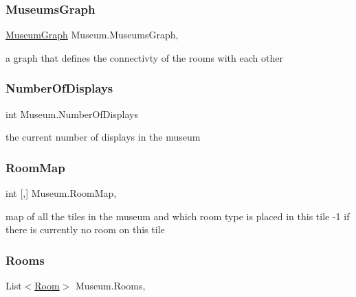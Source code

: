 \subsubsection{\texorpdfstring{Museums\+Graph}{MuseumsGraph}}
{\footnotesize\ttfamily \mbox{\hyperlink{class_museum_graph}{Museum\+Graph}} Museum.\+Museums\+Graph\hspace{0.3cm}{\ttfamily [get]}, {}}



a graph that defines the connectivty of the rooms with each other 

\mbox{\label{class_museum_ac6942612f3be979812b450ee9140caf1}} 
\subsubsection{\texorpdfstring{Number\+Of\+Displays}{NumberOfDisplays}}
{\footnotesize\ttfamily int Museum.\+Number\+Of\+Displays\hspace{0.3cm}{\ttfamily [get]}}



the current number of displays in the museum 

\mbox{\label{class_museum_add7cf92391f0c501eaf2ebb76ddd54f6}} 
\subsubsection{\texorpdfstring{Room\+Map}{RoomMap}}
{\footnotesize\ttfamily int \mbox{[},\mbox{]} Museum.\+Room\+Map\hspace{0.3cm}{\ttfamily [get]}, {}}



map of all the tiles in the museum and which room type is placed in this tile -\/1 if there is currently no room on this tile 

\mbox{\label{class_museum_afbe49bbdcf1b263d32fd0ae323289e7d}} 
\subsubsection{\texorpdfstring{Rooms}{Rooms}}
{\footnotesize\ttfamily List$<$\mbox{\hyperlink{class_room}{Room}}$>$ Museum.\+Rooms\hspace{0.3cm}{\ttfamily [get]}, {}}



